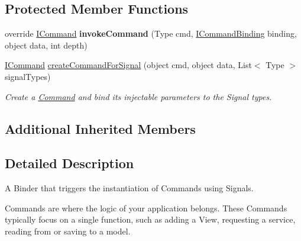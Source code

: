 \subsection*{Protected Member Functions}
\begin{DoxyCompactItemize}
\item 
\hypertarget{classstrange_1_1extensions_1_1command_1_1impl_1_1_signal_command_binder_ae50bae7a041628b864cd02f9d2019064}{override \hyperlink{interfacestrange_1_1extensions_1_1command_1_1api_1_1_i_command}{I\-Command} {\bfseries invoke\-Command} (Type cmd, \hyperlink{interfacestrange_1_1extensions_1_1command_1_1api_1_1_i_command_binding}{I\-Command\-Binding} binding, object data, int depth)}\label{classstrange_1_1extensions_1_1command_1_1impl_1_1_signal_command_binder_ae50bae7a041628b864cd02f9d2019064}

\item 
\hypertarget{classstrange_1_1extensions_1_1command_1_1impl_1_1_signal_command_binder_ab3207df45f860c0e62bf86830ebb9ea9}{\hyperlink{interfacestrange_1_1extensions_1_1command_1_1api_1_1_i_command}{I\-Command} \hyperlink{classstrange_1_1extensions_1_1command_1_1impl_1_1_signal_command_binder_ab3207df45f860c0e62bf86830ebb9ea9}{create\-Command\-For\-Signal} (object cmd, object data, List$<$ Type $>$ signal\-Types)}\label{classstrange_1_1extensions_1_1command_1_1impl_1_1_signal_command_binder_ab3207df45f860c0e62bf86830ebb9ea9}

\begin{DoxyCompactList}\small\item\em Create a \hyperlink{classstrange_1_1extensions_1_1command_1_1impl_1_1_command}{Command} and bind its injectable parameters to the Signal types. \end{DoxyCompactList}\end{DoxyCompactItemize}
\subsection*{Additional Inherited Members}


\subsection{Detailed Description}
A Binder that triggers the instantiation of Commands using Signals. 

Commands are where the logic of your application belongs. These Commands typically focus on a single function, such as adding a View, requesting a service, reading from or saving to a model.

